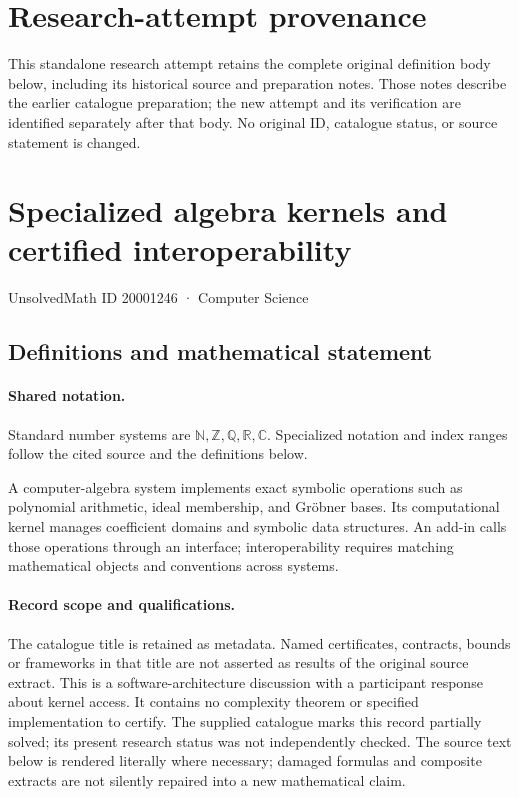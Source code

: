 \documentclass[11pt]{article}
\begin{document}
\section*{Research-attempt provenance}
This standalone research attempt retains the complete original definition body below,
including its historical source and preparation notes. Those notes describe the
earlier catalogue preparation; the new attempt and its verification are identified
separately after that body. No original ID, catalogue status, or source statement is changed.

\section{Specialized algebra kernels and certified interoperability}\label{20001246}
{\small UnsolvedMath ID 20001246 · Computer Science}
\subsection{Definitions and mathematical statement}

\paragraph{Shared notation.}Standard number systems are $\mathbb N,\mathbb Z,\mathbb Q,\mathbb R,\mathbb C$. Specialized notation and index ranges follow the cited source and the definitions below.


A computer-algebra system implements exact symbolic operations such as polynomial arithmetic, ideal membership, and Gröbner bases. Its computational kernel manages coefficient domains and symbolic data structures. An add-in calls those operations through an interface; interoperability requires matching mathematical objects and conventions across systems.
\paragraph{Record scope and qualifications.}
The catalogue title is retained as metadata. Named certificates, contracts, bounds or frameworks in that title are not asserted as results of the original source extract.
This is a software-architecture discussion with a participant response about kernel access. It contains no complexity theorem or specified implementation to certify. The supplied catalogue marks this record partially solved; its present research status was not independently checked.
The source text below is rendered literally where necessary; damaged formulas and composite extracts are not silently repaired into a new mathematical claim.
\end{document}
